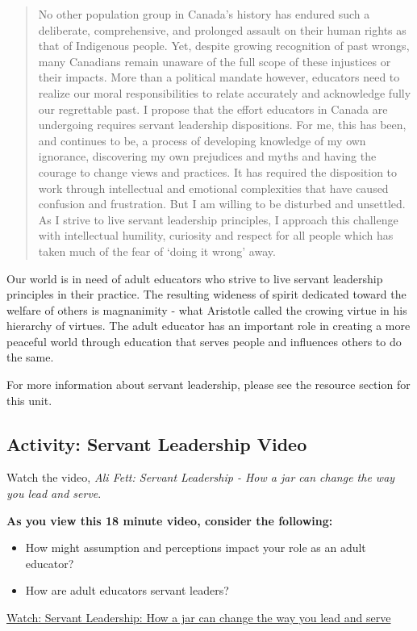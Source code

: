 \documentclass[
]{book}
\providecommand{\tightlist}{%
  \setlength{\itemsep}{0pt}\setlength{\parskip}{0pt}}
\begin{document}
\begin{quote}
No other population group in Canada's history has endured such a deliberate, comprehensive, and prolonged assault on their human rights as that of Indigenous people. Yet, despite growing recognition of past wrongs, many Canadians remain unaware of the full scope of these injustices or their impacts. More than a political mandate however, educators need to realize our moral responsibilities to relate accurately and acknowledge fully our regrettable past. I propose that the effort educators in Canada are undergoing requires servant leadership dispositions. For me, this has been, and continues to be, a process of developing knowledge of my own ignorance, discovering my own prejudices and myths and having the courage to change views and practices. It has required the disposition to work through intellectual and emotional complexities that have caused confusion and frustration. But I am willing to be disturbed and unsettled. As I strive to live servant leadership principles, I approach this challenge with intellectual humility, curiosity and respect for all people which has taken much of the fear of `doing it wrong' away.
\end{quote}

Our world is in need of adult educators who strive to live servant leadership principles in their practice. The resulting wideness of spirit dedicated toward the welfare of others is magnanimity - what Aristotle called the crowing virtue in his hierarchy of virtues. The adult educator has an important role in creating a more peaceful world through education that serves people and influences others to do the same.

For more information about servant leadership, please see the resource section for this unit.

\hypertarget{activity-servant-leadership-video}{%
\subsection*{Activity: Servant Leadership Video}\label{activity-servant-leadership-video}}

\begin{reflect}
Watch the video, \emph{Ali Fett: Servant Leadership - How a jar can
change the way you lead and serve}.

\textbf{As you view this 18 minute video, consider the following:}

\begin{itemize}
\tightlist
\item
  How might assumption and perceptions impact your role as an adult
  educator?\\
\item
  How are adult educators servant leaders?
\end{itemize}

\href{https://www.youtube.com/watch?v=1vIPrR_clEg}{Watch: Servant
Leadership: How a jar can change the way you lead and serve}
\end{reflect}
\end{document}
